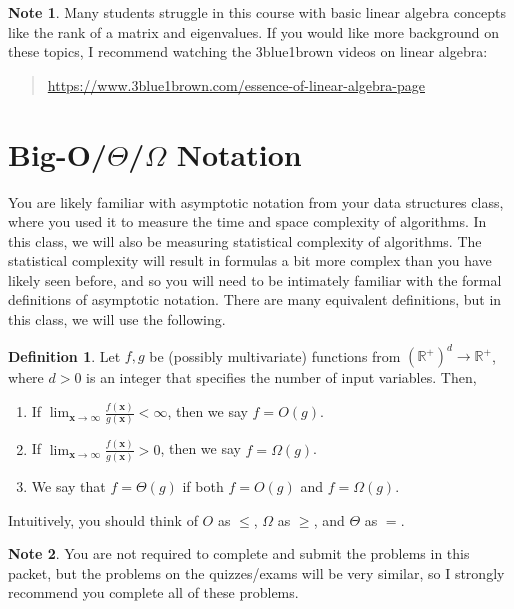 \documentclass[10pt]{article}
\theoremstyle{definition}
\newtheorem{note}{Note}
\newtheorem{defn}{Definition}
\newcommand{\R}{\mathbb R}
\newcommand{\x}{\mathbf x}
\begin{document}
\begin{note}
Many students struggle in this course with basic linear algebra concepts like the rank of a matrix and eigenvalues.
If you would like more background on these topics, I recommend watching the 3blue1brown videos on linear algebra:
\begin{quote}
    \url{https://www.3blue1brown.com/essence-of-linear-algebra-page}
\end{quote}
\end{note}

\section{Big-O/$\Theta$/$\Omega$ Notation}

You are likely familiar with asymptotic notation from your data structures class,
where you used it to measure the time and space complexity of algorithms.
In this class,
we will also be measuring statistical complexity of algorithms.
The statistical complexity will result in formulas a bit more complex than you have likely seen before,
and so you will need to be intimately familiar with the formal definitions of asymptotic notation.
There are many equivalent definitions, but in this class, we will use the following.

\begin{defn}
    Let $f,g$ be (possibly multivariate) functions from $(\R^+)^d\to\R^+$,
    where $d>0$ is an integer that specifies the number of input variables.
    Then,
    \begin{enumerate}
        \item If $\displaystyle\lim_{\x\to\infty} \frac{f(\x)}{g(\x)} < \infty$, then we say $f = O(g)$.
        \item If $\displaystyle\lim_{\x\to\infty} \frac{f(\x)}{g(\x)} > 0$, then we say $f = \Omega(g)$.
        \item We say that $f = \Theta(g)$ if both $f=O(g)$ and $f=\Omega(g)$.
    \end{enumerate}
    Intuitively, you should think of $O$ as $\le$, $\Omega$ as $\ge$, and $\Theta$ as $=$.
\end{defn}



\newpage
\begin{note}
You are not required to complete and submit the problems in this packet,
but the problems on the quizzes/exams will be very similar,
so I strongly recommend you complete all of these problems.
\end{note}
\end{document}

